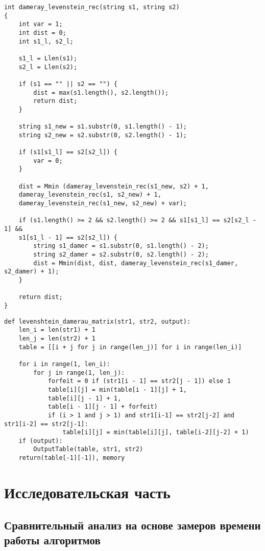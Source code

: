 \documentclass[12pt]{report}
\begin{document}
\begin{lstlisting}[label=some-code,caption=Функция нахождения расстояния Дамерау-Левенштейна рекурсивно]
int dameray_levenstein_rec(string s1, string s2)
{
	int var = 1;
	int dist = 0;
	int s1_l, s2_l;
	
	s1_l = Llen(s1);
	s2_l = Llen(s2);
	
	if (s1 == "" || s2 == "") {
		dist = max(s1.length(), s2.length());
		return dist;
	}
	
	string s1_new = s1.substr(0, s1.length() - 1);
	string s2_new = s2.substr(0, s2.length() - 1);
	
	if (s1[s1_l] == s2[s2_l]) {
		var = 0;
	}
	
	dist = Mmin (dameray_levenstein_rec(s1_new, s2) + 1,
	dameray_levenstein_rec(s1, s2_new) + 1,
	dameray_levenstein_rec(s1_new, s2_new) + var);
	
	if (s1.length() >= 2 && s2.length() >= 2 && s1[s1_l] == s2[s2_l - 1] &&
	s1[s1_l - 1] == s2[s2_l]) {
		string s1_damer = s1.substr(0, s1.length() - 2);
		string s2_damer = s2.substr(0, s2.length() - 2);
		dist = Mmin(dist, dist, dameray_levenstein_rec(s1_damer, s2_damer) + 1);
	}
	
	return dist;
}
\end{lstlisting}

\begin{lstlisting}[label=some-code,caption=Функция нахождения расстояния Дамерау-Левенштейна матрично]
def levenshtein_damerau_matrix(str1, str2, output):
	len_i = len(str1) + 1
	len_j = len(str2) + 1
	table = [[i + j for j in range(len_j)] for i in range(len_i)]

	for i in range(1, len_i):
		for j in range(1, len_j):
			forfeit = 0 if (str1[i - 1] == str2[j - 1]) else 1
			table[i][j] = min(table[i - 1][j] + 1,
			table[i][j - 1] + 1,
			table[i - 1][j - 1] + forfeit)
			if (i > 1 and j > 1) and str1[i-1] == str2[j-2] and str1[i-2] == str2[j-1]:
				table[i][j] = min(table[i][j], table[i-2][j-2] + 1)
	if (output):        
		OutputTable(table, str1, str2)
	return(table[-1][-1]), memory
\end{lstlisting}


\chapter{Исследовательская часть}

\section{Сравнительный анализ на основе замеров времени работы алгоритмов}
\end{document}

